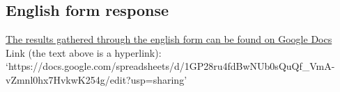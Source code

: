 \documentclass[twoside]{uva-inf-bachelor-thesis}
\theoremstyle{definition}
\begin{document}
\begin{appendices}
\section{English form response}
\href{https://docs.google.com/spreadsheets/d/1GP28ru4fdBwNUb0sQuQf_VmA-vZmnl0hx7HvkwK254g/edit?usp=sharing}{The results gathered through the english form can be found on Google Docs}\\
Link (the text above is a hyperlink):\\ `https://docs.google.com/spreadsheets/d/1GP28ru4fdBwNUb0sQuQf\_VmA-\\vZmnl0hx7HvkwK254g/edit?usp=sharing'
\end{appendices}
\end{document}
